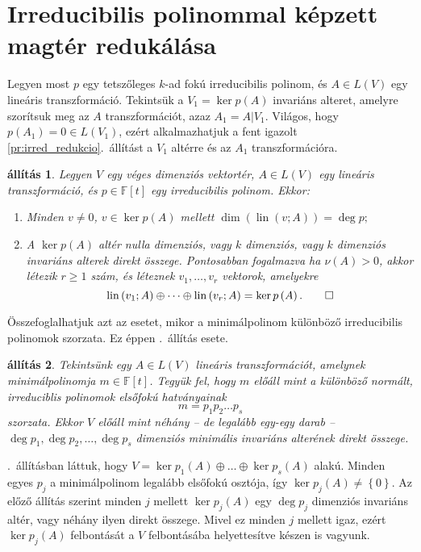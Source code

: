 \documentclass[9pt, a4paper, showtrims]{memoir}
\makeatletter
\let\Aref\relax
\renewenvironment{proof}[1][\proofname]
    {\par\pushQED{\qed}%
    \normalfont \topsep6\p@\@plus6\p@\relax
    \trivlist
    \item[\hskip\labelsep
        \itshape
    #1\@addpunct{:}]\ignorespaces}
    {\popQED\endtrivlist\@endpefalse}
\theoremstyle{plain}
\newtheorem{proposition}{állítás}[chapter]
\theoremstyle{remark}
\theoremstyle{definition}
\DeclareMathOperator{\lin}{lin}
\makeatother
\begin{document}
\section{Irreducibilis polinommal képzett magtér redukálása}
Legyen most $p$ egy tetszőleges $k$-ad fokú irreducibilis polinom,
és $A\in L(V)$ egy lineáris transzformáció.
Tekintsük a $V_1=\ker p\left( A \right)$ invariáns alteret, amelyre szorítsuk meg az $A$
transzformációt, azaz $A_1=A|V_1$.
Világos, hogy $p\left( A_1 \right)=0\in L\left( V_1 \right)$,
ezért alkalmazhatjuk a fent igazolt \ref{pr:irred_redukcio}.~állítást
a $V_1$ altérre és az $A_1$ transzformációra.
\begin{proposition}\label{pr:csaba}
	Legyen $V$ egy véges dimenziós vektortér, $A\in L\left( V \right)$ egy lineáris transzformáció,
	és $p\in\mathbb{F}\left[ t \right]$ egy irreducibilis polinom.
	Ekkor:
	\begin{enumerate}
		\item Minden $v\neq 0$, $v\in\ker p\left( A \right)$ mellett
		      \(
		      \dim\left( \lin(v;A) \right)=\deg p;
		      \)
		\item A $\ker p\left( A \right)$ altér nulla dimenziós,
		      vagy $k$ dimenziós, vagy $k$ dimenziós invariáns alterek direkt összege.
		      Pontosabban fogalmazva
		      ha $\nu\left( A \right)>0$, akkor létezik $r\geq 1$ szám,
		      és léteznek $v_1,\ldots,v_r$ vektorok, amelyekre
		      \[
			      \lin\left( v_1;A \right)\oplus\dots\oplus \lin\left( v_r;A \right)
			      =
			      \ker p\left( A \right).
			      \qedhere
		      \]
	\end{enumerate}
\end{proposition}
Összefoglalhatjuk azt az esetet,
mikor a minimálpolinom különböző irreducibilis polinomok szorzata.
Ez éppen .~állítás esete.
\begin{proposition}\label{pr:minpolelsofokufelbontas}
	Tekintsünk egy $A\in L\left( V \right)$ lineáris transzformációt,
	amelynek minimálpolinomja $m\in\mathbb{F}\left[ t \right]$.
	Tegyük fel,
	hogy $m$ előáll mint a különböző normált, irreduciblis polinomok elsőfokú hatványainak
	\[
		m=p_1p_2\dots p_s
	\]
	szorzata.
	Ekkor $V$ előáll mint néhány -- de legalább egy-egy darab --
	$\deg p_1,\deg p_2,\ldots,\deg p_s$ dimenziós minimális invariáns alterének direkt összege.
\end{proposition}
\begin{proof}
	\Aref{pr:redukcio-primfelbontas}.~állításban láttuk,
	hogy $V=\ker p_1\left( A \right)\oplus\dots\oplus\ker p_s\left( A \right)$ alakú.
	Minden egyes $p_j$ a minimálpolinom legalább elsőfokú osztója, így $\ker p_j\left( A \right)\neq\left\{ 0 \right\}$.
	Az előző állítás szerint minden $j$ mellett $\ker p_j\left( A \right)$ egy $\deg p_j$
	dimenziós invariáns altér, vagy néhány ilyen direkt összege.
	Mivel ez minden $j$ mellett igaz, ezért $\ker p_j\left( A \right)$ felbontását a $V$ felbontásába helyettesítve készen is vagyunk.
\end{proof}
\end{document}
